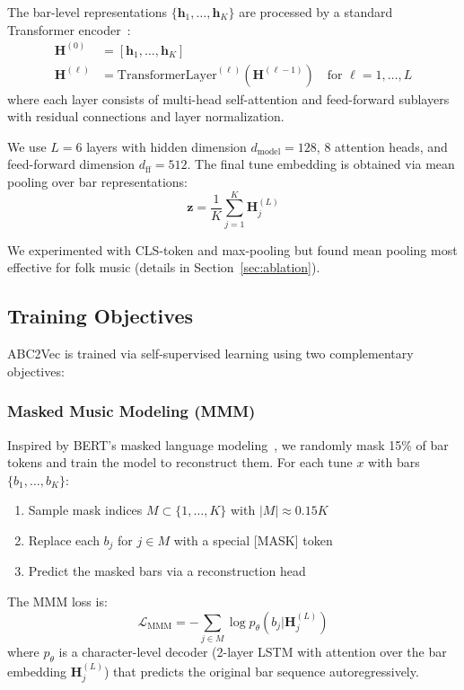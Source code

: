 \documentclass[]{interact}
\theoremstyle{plain}
\theoremstyle{definition}
\theoremstyle{remark}
\begin{document}
The bar-level representations $\{\mathbf{h}_1, \ldots, \mathbf{h}_K\}$ are processed by a standard Transformer encoder~\cite{Transformer2017}:
\begin{align}
\mathbf{H}^{(0)} &= [\mathbf{h}_1, \ldots, \mathbf{h}_K] \\
\mathbf{H}^{(\ell)} &= \text{TransformerLayer}^{(\ell)}(\mathbf{H}^{(\ell-1)}) \quad \text{for } \ell = 1, \ldots, L
\end{align}
where each layer consists of multi-head self-attention and feed-forward sublayers with residual connections and layer normalization.

We use $L=6$ layers with hidden dimension $d_\text{model} = 128$, 8 attention heads, and feed-forward dimension $d_\text{ff} = 512$. The final tune embedding is obtained via mean pooling over bar representations:
\begin{equation}
\mathbf{z} = \frac{1}{K} \sum_{j=1}^K \mathbf{H}^{(L)}_j
\end{equation}

We experimented with CLS-token and max-pooling but found mean pooling most effective for folk music (details in Section~\ref{sec:ablation}).

\subsection{Training Objectives}

ABC2Vec is trained via self-supervised learning using two complementary objectives:

\subsubsection{Masked Music Modeling (MMM)}

Inspired by BERT's masked language modeling~\cite{BERT2019}, we randomly mask 15\% of bar tokens and train the model to reconstruct them. For each tune $x$ with bars $\{b_1, \ldots, b_K\}$:
\begin{enumerate}
\item Sample mask indices $M \subset \{1, \ldots, K\}$ with $|M| \approx 0.15K$
\item Replace each $b_j$ for $j \in M$ with a special [MASK] token
\item Predict the masked bars via a reconstruction head
\end{enumerate}

The MMM loss is:
\begin{equation}
\mathcal{L}_{\text{MMM}} = -\sum_{j \in M} \log p_\theta(b_j | \mathbf{H}^{(L)}_j)
\end{equation}
where $p_\theta$ is a character-level decoder (2-layer LSTM with attention over the bar embedding $\mathbf{H}^{(L)}_j$) that predicts the original bar sequence autoregressively.
\end{document}

